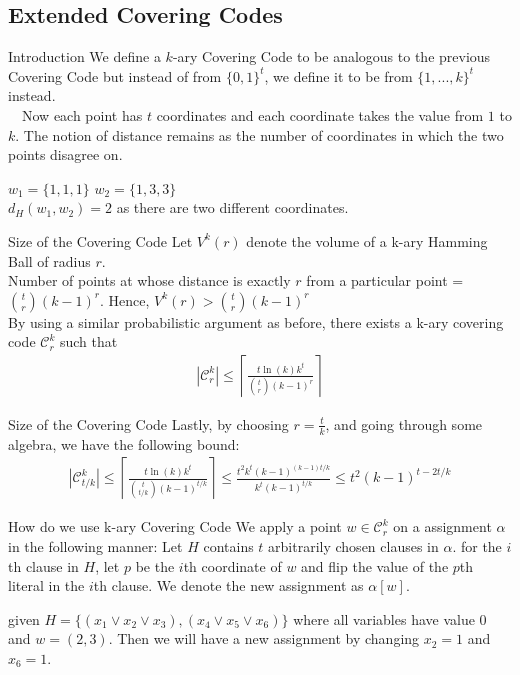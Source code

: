 \documentclass[pdf] {beamer}
\newcommand{\dist}[2]{d_H(#1,#2)}
\newcommand{\cc}{\mathcal{C}}
\begin{document}
	\subsection{Extended Covering Codes}
	\begin{frame}{Introduction}
	We define a $k$-ary Covering Code to be analogous to the previous Covering Code but instead of from $\{0,1\}^t$, we define it to be from $\{1,...,k\}^t$ instead. \\~\
	Now each point has $t$ coordinates and each coordinate takes the value from $1$ to $k$. The notion of distance remains as the number of coordinates in which the two points disagree on.
	\begin{example}
		$w_1 = \{1, 1, 1\}$ $w_2 = \{1, 3, 3\}$ \\
		$\dist{w_1}{w_2} = 2$ as there are two different coordinates.
	\end{example}

	\end{frame}
	\begin{frame}{Size of the Covering Code}
	Let $V^k(r)$ denote the volume of a k-ary Hamming Ball of radius $r$. \\
	Number of points at whose distance is exactly $r$ from a particular point = $ {t \choose r}(k-1)^r$. Hence, $V^k(r) > {t \choose r}(k-1)^r$ \\
	By using a similar probabilistic argument as before, there exists a k-ary covering code $\cc_r^k$ such that 
	\begin{align*}
	|\cc^k_r| \leq \left \lceil \frac{t\ln(k)k^t}{{t \choose r}(k-1)^r} \right \rceil
	\end{align*}
	\end{frame}
	\begin{frame}{Size of the Covering Code}
	Lastly, by choosing $r = \frac{t}{k}$, and going through some algebra, we have the following bound:
	\begin{align*}
	|\cc^k_{{t/k}}| \leq \left \lceil \frac{t\ln(k)k^t}{{t \choose t/k}(k-1)^{t/k}} \right \rceil \leq \frac{t^2 k^t (k-1)^{(k-1)t/k}}{k^t(k-1)^{t/k}} \leq t^2(k-1)^{t-2t/k}
	\end{align*}
	\end{frame}
	\begin{frame}{How do we use k-ary Covering Code}
	 We apply a point $w \in \cc_r^k$ on a assignment $\alpha$ in the following manner: Let $H$ contains $t$ arbitrarily chosen clauses in $\alpha$. for the $i$th clause in $H$, let $p$ be the $i$th coordinate of $w$ and flip the value of the $p$th literal in the $i$th clause. We denote the new assignment as $\alpha[w]$.
	 \begin{example}			
	 	given $H = \{(x_1 \lor x_2 \lor x_3), (x_4 \lor x_5 \lor x_6)\}$ where all variables have value $0$ and $w = (2,3)$. Then we will have a new assignment by changing $x_2 = 1$ and $x_6 = 1$.
	 \end{example}
	\end{frame}
\end{document}
